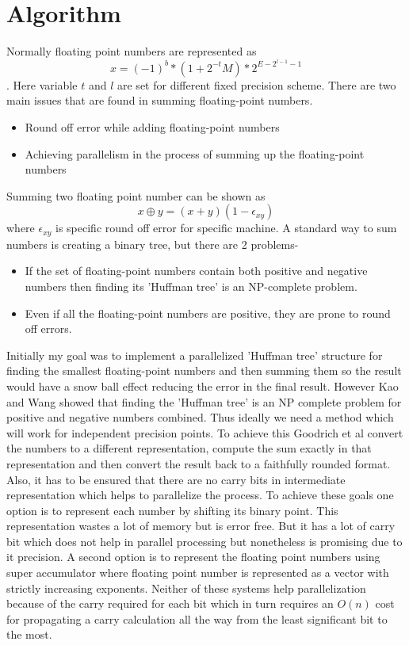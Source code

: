 \documentclass[11pt]{article}       %
\begin{document}
\section{Algorithm} \label{algo}

Normally floating point numbers are represented as $$x=(-1)^{b} * (1+2^{-t}M)*2^{E-2^{l-1}-1}$$. Here variable $t$ and $l$ are set for different fixed precision scheme. There are two main issues that are found in summing floating-point numbers.

\begin{itemize}
	\item Round off error while adding floating-point numbers
	\item Achieving parallelism in the process of summing up the floating-point numbers
\end{itemize}

Summing two floating point number can be shown as $$x \oplus y = (x+y)(1- \epsilon_{xy})$$ where $\epsilon_{xy}$ is specific round off error for specific machine.
A standard way to sum numbers is creating a binary tree, but there are 2 problems-

\begin{itemize}
	\item If the set of floating-point numbers contain both positive and negative numbers then finding its 'Huffman tree' is an NP-complete problem. \cite{LTALCNS}
	\item Even if all the floating-point numbers are positive, they are prone to round off errors.
\end{itemize}

Initially my goal was to implement a parallelized 'Huffman tree' structure for finding the smallest floating-point numbers and then summing them so the result would have a snow ball effect reducing the error in the final result. However Kao and Wang \cite{LTALCNS} showed that finding the 'Huffman tree' is an NP complete problem for positive and negative numbers combined. Thus ideally we need a method which will work for independent precision points. To achieve this Goodrich et al \cite{PASFPN} convert the numbers to a different representation, compute the sum exactly in that representation and then convert the result back to a faithfully rounded format. Also, it has to be ensured that there are no carry bits in intermediate representation which helps to parallelize the process. To achieve these goals one option is to represent each number by shifting its binary point. This representation wastes a lot of memory but is error free. But it has a lot of carry bit which does not help in parallel processing but nonetheless is promising due to it precision. A second option is to represent the floating point numbers using super accumulator where floating point number is represented as a vector with strictly increasing exponents. Neither of these systems help parallelization because of the carry required for each bit which in turn requires an $O(n)$ cost for propagating a carry calculation all the way from the least significant bit to the most.
\end{document}
